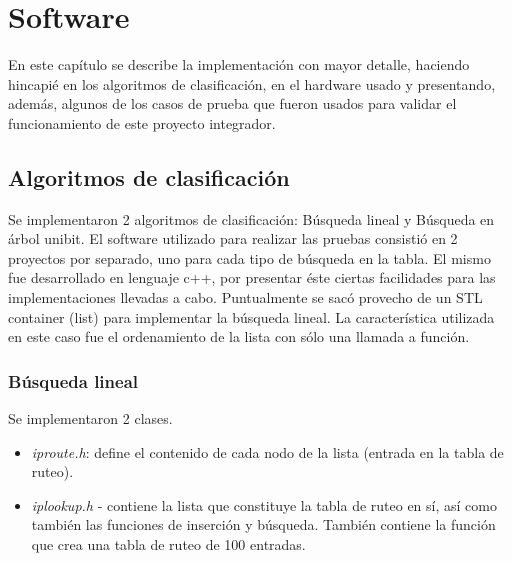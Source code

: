 \chapter{Software}

En este capítulo se describe la implementación con mayor detalle, haciendo hincapié en los algoritmos de clasificación, en el hardware usado y presentando, además, algunos de los casos de prueba que fueron usados para validar el funcionamiento de este proyecto integrador.


\section{Algoritmos de clasificación}


Se implementaron 2 algoritmos de clasificación: Búsqueda lineal y Búsqueda en árbol unibit. El software utilizado para realizar las pruebas consistió en 2 proyectos por separado, uno para cada tipo de búsqueda en la tabla. El mismo fue desarrollado en lenguaje c++, por presentar éste ciertas facilidades para las implementaciones llevadas a cabo. Puntualmente se sacó provecho de un STL container (list) para implementar la búsqueda lineal. La característica utilizada en este caso fue el ordenamiento de la lista con sólo una llamada a función.

\subsection {Búsqueda lineal}

Se implementaron 2 clases. 

\begin{itemize}
	\item \textit{iproute.h}: define el contenido de cada nodo de la lista (entrada en la tabla de ruteo).
	\item \textit{iplookup.h} -  contiene la lista que constituye la tabla de ruteo en sí, así como también las funciones de inserción y búsqueda. También contiene la función que crea una tabla de ruteo de 100 entradas.
\end{itemize}

